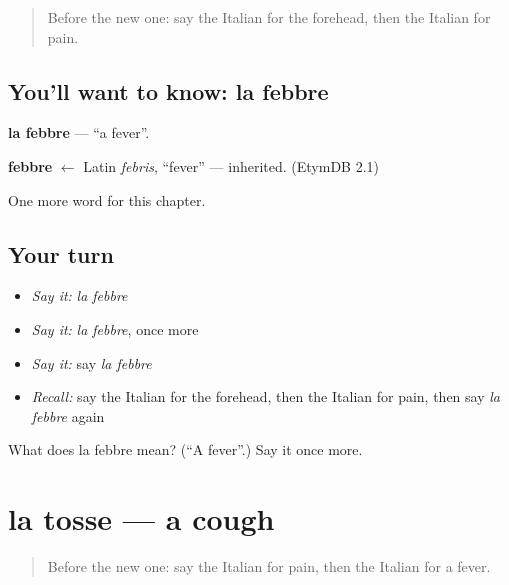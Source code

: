 \label{lesson:IT-C40-febbre}



\begin{quote}
Before the new one: say the Italian for the forehead, then the Italian for pain.
\end{quote}

\subsection*{You'll want to know: la febbre}
\textbf{la febbre} — \textquotedblleft{}a fever\textquotedblright{}.

\begin{cousinweb}
\textbf{febbre} $\leftarrow$ Latin \emph{febris}, \textquotedblleft{}fever\textquotedblright{} — inherited. (EtymDB 2.1)
\end{cousinweb}

\begin{grammarlens}[title={What you've built}]
One more word for this chapter.
\end{grammarlens}

\subsection*{Your turn}
\begin{itemize}
\raggedright
  \item \emph{Say it:} \emph{la febbre}
  \item \emph{Say it:} \emph{la febbre}, once more
  \item \emph{Say it:} say \emph{la febbre}
  \item \emph{Recall:} say the Italian for the forehead, then the Italian for pain, then say \emph{la febbre} again
\end{itemize}

\begin{tcolorbox}[breakable,colback=teal!4,colframe=teal!35!black,title={Before you move on}]
What does la febbre mean? (\textquotedblleft{}A fever\textquotedblright{}.) Say it once more.
\end{tcolorbox}
\section[la tosse]{la tosse — a cough}

\label{lesson:IT-C40-tosse}



\begin{quote}
Before the new one: say the Italian for pain, then the Italian for a fever.
\end{quote}

